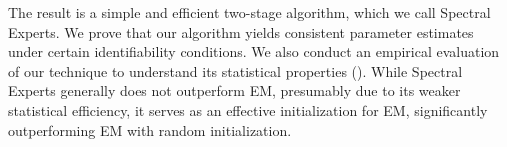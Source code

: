 






The result is a simple and efficient two-stage algorithm,
which we call Spectral Experts.
We prove that our algorithm yields consistent parameter estimates under certain
identifiability conditions.  We also conduct an empirical evaluation
of our technique to understand its statistical properties ().
While Spectral Experts generally does not outperform EM, presumably due to its
weaker statistical efficiency, it serves as an effective initialization for EM,
significantly outperforming EM with random initialization.

